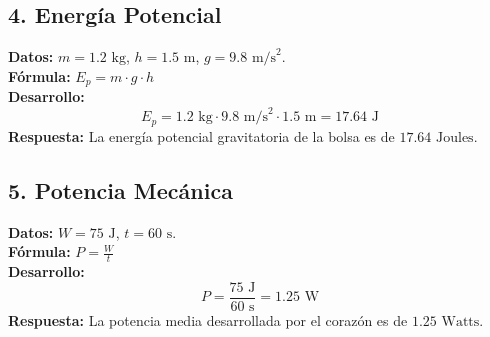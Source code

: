 \documentclass[12pt,letterpaper]{article}
\begin{document}
\subsection*{4. Energía Potencial}
\textbf{Datos:} $m = 1.2 \text{ kg}$, $h = 1.5 \text{ m}$, $g = 9.8 \text{ m/s}^2$. \\
\textbf{Fórmula:} $E_p = m \cdot g \cdot h$ \\
\textbf{Desarrollo:} 
\[ E_p = 1.2 \text{ kg} \cdot 9.8 \text{ m/s}^2 \cdot 1.5 \text{ m} = 17.64 \text{ J} \]
\textbf{Respuesta:} La energía potencial gravitatoria de la bolsa es de \textbf{$17.64 \text{ Joules}$}.

\subsection*{5. Potencia Mecánica}
\textbf{Datos:} $W = 75 \text{ J}$, $t = 60 \text{ s}$. \\
\textbf{Fórmula:} $P = \frac{W}{t}$ \\
\textbf{Desarrollo:} 
\[ P = \frac{75 \text{ J}}{60 \text{ s}} = 1.25 \text{ W} \]
\textbf{Respuesta:} La potencia media desarrollada por el corazón es de \textbf{$1.25 \text{ Watts}$}.
\end{document}
